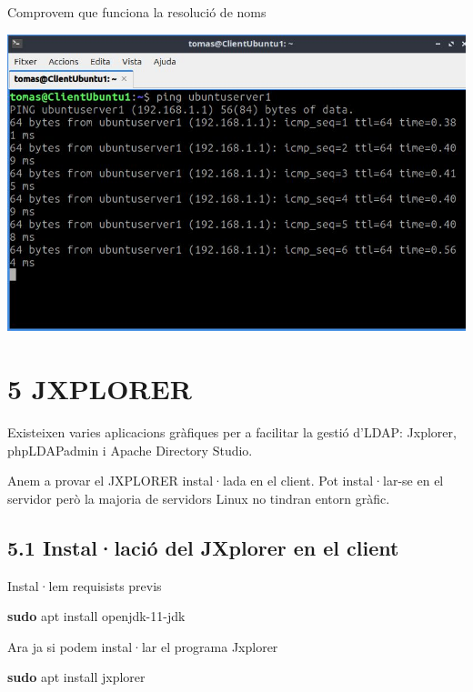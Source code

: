 \documentclass[
  12 pt,
  a4paper,
]{article}
\newenvironment{Shaded}{\begin{snugshade}}{\end{snugshade}}
\newcommand{\FunctionTok}[1]{\textcolor[rgb]{0.13,0.29,0.53}{\textbf{#1}}}
\newcommand{\NormalTok}[1]{#1}
\begin{document}
Comprovem que funciona la resolució de noms

\includegraphics{png/pingNomServidor.jpg}

\section{5 JXPLORER}\label{jxplorer}

Existeixen varies aplicacions gràfiques per a facilitar la gestió
d'LDAP: Jxplorer, phpLDAPadmin i Apache Directory Studio.

Anem a provar el JXPLORER instal·lada en el client. Pot instal·lar-se en
el servidor però la majoria de servidors Linux no tindran entorn gràfic.

\subsection{5.1 Instal·lació del JXplorer en el
client}\label{installaciuxf3-del-jxplorer-en-el-client}

Instal·lem requisists previs

\begin{Shaded}
\begin{Highlighting}[]
\FunctionTok{sudo}\NormalTok{ apt install openjdk{-}11{-}jdk}
\end{Highlighting}
\end{Shaded}

Ara ja si podem instal·lar el programa Jxplorer

\begin{Shaded}
\begin{Highlighting}[]
    \FunctionTok{sudo}\NormalTok{ apt install jxplorer}
\end{Highlighting}
\end{Shaded}
\end{document}
